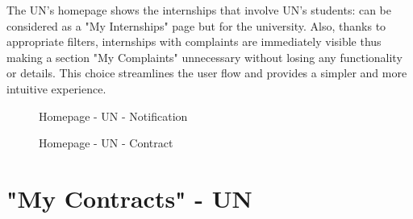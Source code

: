 \par The UN's homepage shows the internships that involve UN's students: can be considered as a "My Internships" page
but for the university. Also, thanks to appropriate filters, internships with complaints are immediately visible thus
making a section "My Complaints" unnecessary without losing any functionality or details. This choice streamlines the
user flow and provides a simpler and more intuitive experience.

\begin{figure}[H]
    \centering
    \caption{Homepage - UN - Notification}
    \label{fig:homepage-un-notification}
\end{figure}

\begin{figure}[H]
    \centering
    \caption{Homepage - UN - Contract}
    \label{fig:homepage-un-contract}
\end{figure}

\section{"My Contracts" - UN}
\label{subsec:my-contracts-un}%

